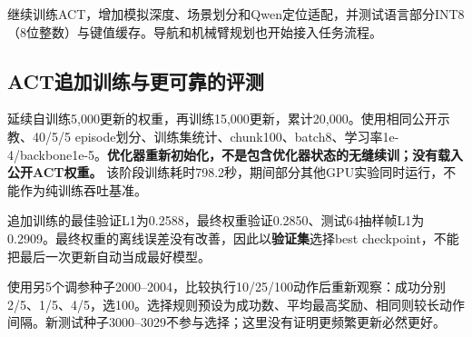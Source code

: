 \label{stage:s04}

继续训练ACT，增加模拟深度、场景划分和Qwen定位适配，并测试语言部分INT8（8位整数）与键值缓存。导航和机械臂规划也开始接入任务流程。

\subsection{ACT追加训练与更可靠的评测}\label{s04-detail-1}

延续自训练5,000更新的权重，再训练15,000更新，累计20,000。使用相同公开示教、40/5/5 episode划分、训练集统计、chunk100、batch8、学习率1e-4/backbone1e-5。\textbf{优化器重新初始化，不是包含优化器状态的无缝续训；没有载入公开ACT权重。} 该阶段训练耗时798.2秒，期间部分其他GPU实验同时运行，不能作为纯训练吞吐基准。

追加训练的最佳验证L1为0.2588，最终权重验证0.2850、测试64抽样帧L1为0.2909。最终权重的离线误差没有改善，因此以\textbf{验证集}选择best checkpoint，不能把最后一次更新自动当成最好模型。


使用另5个调参种子2000--2004，比较执行10/25/100动作后重新观察：成功分别2/5、1/5、4/5，选100。选择规则预设为成功数、平均最高奖励、相同则较长动作间隔。新测试种子3000--3029不参与选择；这里没有证明更频繁更新必然更好。

